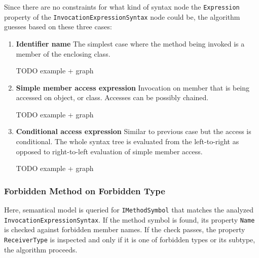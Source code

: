 \documentclass[
  digital, %
  table,   %
  lof,     %
  lot,     %
  oneside,
]{fithesis3}
\begin{document}
Since there are no constraints for what kind of syntax node the \texttt{Expression} property of the \texttt{InvocationExpressionSyntax} node could be, the algorithm guesses based on these three cases:
\begin{enumerate}
  \item \textbf{Identifier name}
  The simplest case where the method being invoked is a member of the enclosing class.

  TODO example + graph
  
  \item \textbf{Simple member access expression}
  Invocation on member that is being accessed on object, or class. Accesses can be possibly chained.
  
  TODO example + graph
    
  \item \textbf{Conditional access expression}
  Similar to previous case but the access is conditional. The whole syntax tree is evaluated from the left-to-right as opposed to right-to-left evaluation of simple member access.  
  
  TODO example + graph
  
\end{enumerate} 


\subsubsection{Forbidden Method on Forbidden Type}
Here, semantical model is queried for \texttt{IMethodSymbol} that matches the analyzed \texttt{InvocationExpressionSyntax}. If the method symbol is found, its property \texttt{Name} is checked against forbidden member names. If the check passes, the property \texttt{ReceiverType} is inspected and only if it is one of forbidden types or its subtype, the algorithm proceeds. 
\end{document}
